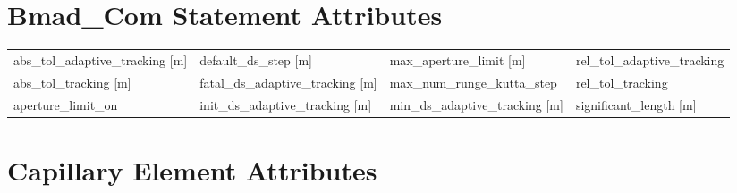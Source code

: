  \section{Bmad_Com Statement Attributes}
 \label{s:list.bmad.com}
 
 \begin{tabular}{llll} \toprule
abs_tol_adaptive_tracking [m]    & default_ds_step [m]              & max_aperture_limit [m]           & rel_tol_adaptive_tracking        \\
abs_tol_tracking [m]             & fatal_ds_adaptive_tracking [m]   & max_num_runge_kutta_step         & rel_tol_tracking                 \\
aperture_limit_on                & init_ds_adaptive_tracking [m]    & min_ds_adaptive_tracking [m]     & significant_length [m]           \\
 \bottomrule
 \end{tabular}
 \vfill
 
 \section{Capillary Element Attributes}
 \label{s:list.capillary}
 
